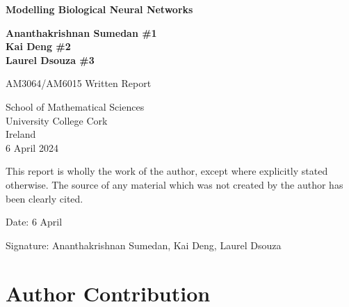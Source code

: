\documentclass[12pt,a4paper]{report}
\begin{document}


\begin{titlepage} \vspace{1cm}

    \begin{center}
    \textbf{\Huge Modelling Biological Neural Networks}
    \end{center}
    
    \vspace{1.5cm}
    
    \begin{center}
    \textbf{\LARGE Ananthakrishnan Sumedan \#1 \\ Kai Deng \#2\\ Laurel Dsouza \#3}{\LARGE\par}
    \end{center}
    
    \vfill{}
    
    \begin{center}
    {\Large AM3064/AM6015 Written Report}
    \par\end{center}
    
    \vspace{1cm}
    
    \begin{center}
    \Large{School of Mathematical Sciences \\
    University College Cork \\
    Ireland \\
    6 April 2024}
    \end{center}
    
\end{titlepage}

This report is wholly the work of the author, except where explicitly
stated otherwise. The source of any material which was not created
by the author has been clearly cited. \\
\medskip{}

Date: 6 April

\medskip{}

Signature: Ananthakrishnan Sumedan, Kai Deng, Laurel Dsouza


\tableofcontents{}

\chapter{Author Contribution}
\end{document}
